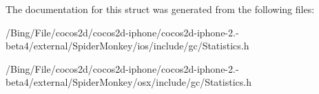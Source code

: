 The documentation for this struct was generated from the following files\-:\begin{DoxyCompactItemize}
\item 
/\-Bing/\-File/cocos2d/cocos2d-\/iphone/cocos2d-\/iphone-\/2.-\/beta4/external/\-Spider\-Monkey/ios/include/gc/Statistics.\-h\item 
/\-Bing/\-File/cocos2d/cocos2d-\/iphone/cocos2d-\/iphone-\/2.-\/beta4/external/\-Spider\-Monkey/osx/include/gc/Statistics.\-h\end{DoxyCompactItemize}
